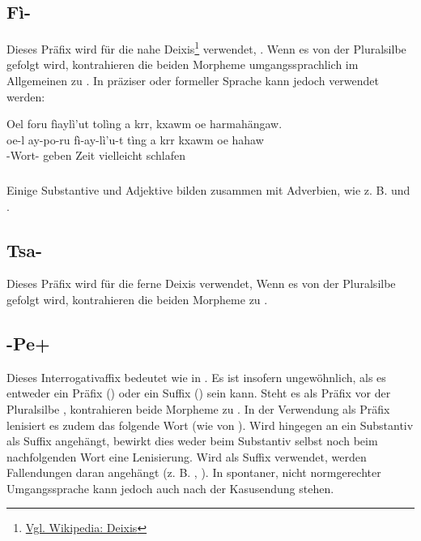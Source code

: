 \subsection{Fì-} Dieses Präfix wird für die nahe Deixis\footnote{\href{https://de.wikipedia.org/wiki/Deixis}{Vgl. Wikipedia: Deixis}} verwendet, .
Wenn es von der Pluralsilbe  gefolgt wird, kontrahieren die beiden Morpheme umgangssprachlich im Allgemeinen zu  . 
In präziser oder formeller Sprache kann jedoch  verwendet werden: \label{morph:prenoun:fi}

\begin{interlin}
	\glll \Npawl{}Oel foru fìaylì'ut tolìng a krr, kxawm oe harmahängaw. \\
	oe-l ay-po-ru fì-ay-lì'u-t tìng a krr kxawm oe hahaw \\
	  -Wort- geben  Zeit vielleicht  schlafen \\
\end{interlin}


\subsubsection{} Einige Substantive und Adjektive bilden zusammen mit  Adverbien, wie z. B.   und  .

\subsection{Tsa-} Dieses Präfix wird für die ferne Deixis verwendet,  Wenn es von der Pluralsilbe  gefolgt wird, kontrahieren die beiden Morpheme zu  .
 

\subsection{-Pe+} \label{morph:pre:pe} Dieses Interrogativaffix bedeutet  wie in  . Es ist insofern ungewöhnlich, als es entweder ein Präfix () oder ein Suffix () sein kann. Steht es als Präfix vor der Pluralsilbe , kontrahieren beide Morpheme zu . In der Verwendung als Präfix lenisiert es zudem das folgende Wort (wie  von ). Wird  hingegen an ein Substantiv als Suffix angehängt, bewirkt dies weder beim Substantiv selbst noch beim nachfolgenden Wort eine Lenisierung. Wird  als Suffix verwendet, werden Fallendungen daran angehängt (z. B. , ). In spontaner, nicht normgerechter Umgangssprache kann  jedoch auch nach der Kasusendung stehen.


